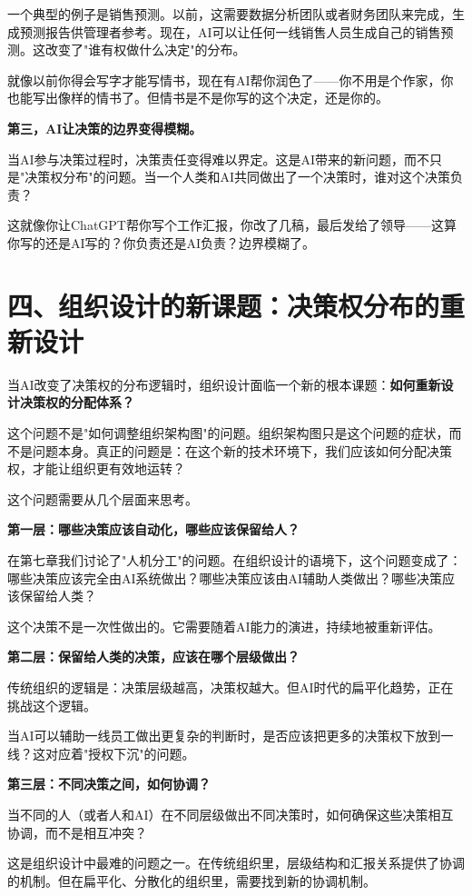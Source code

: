 一个典型的例子是销售预测。以前，这需要数据分析团队或者财务团队来完成，生成预测报告供管理者参考。现在，AI可以让任何一线销售人员生成自己的销售预测。这改变了"谁有权做什么决定"的分布。

就像以前你得会写字才能写情书，现在有AI帮你润色了——你不用是个作家，你也能写出像样的情书了。但情书是不是你写的这个决定，还是你的。

\textbf{第三，AI让决策的边界变得模糊。}

当AI参与决策过程时，决策责任变得难以界定。这是AI带来的新问题，而不只是"决策权分布"的问题。当一个人类和AI共同做出了一个决策时，谁对这个决策负责？

这就像你让ChatGPT帮你写个工作汇报，你改了几稿，最后发给了领导——这算你写的还是AI写的？你负责还是AI负责？边界模糊了。

\section{四、组织设计的新课题：决策权分布的重新设计}


当AI改变了决策权的分布逻辑时，组织设计面临一个新的根本课题：\textbf{如何重新设计决策权的分配体系？}

这个问题不是"如何调整组织架构图"的问题。组织架构图只是这个问题的症状，而不是问题本身。真正的问题是：在这个新的技术环境下，我们应该如何分配决策权，才能让组织更有效地运转？

这个问题需要从几个层面来思考。

\textbf{第一层：哪些决策应该自动化，哪些应该保留给人？}

在第七章我们讨论了"人机分工"的问题。在组织设计的语境下，这个问题变成了：哪些决策应该完全由AI系统做出？哪些决策应该由AI辅助人类做出？哪些决策应该保留给人类？

这个决策不是一次性做出的。它需要随着AI能力的演进，持续地被重新评估。

\textbf{第二层：保留给人类的决策，应该在哪个层级做出？}

传统组织的逻辑是：决策层级越高，决策权越大。但AI时代的扁平化趋势，正在挑战这个逻辑。

当AI可以辅助一线员工做出更复杂的判断时，是否应该把更多的决策权下放到一线？这对应着"授权下沉"的问题。

\textbf{第三层：不同决策之间，如何协调？}

当不同的人（或者人和AI）在不同层级做出不同决策时，如何确保这些决策相互协调，而不是相互冲突？

这是组织设计中最难的问题之一。在传统组织里，层级结构和汇报关系提供了协调的机制。但在扁平化、分散化的组织里，需要找到新的协调机制。


